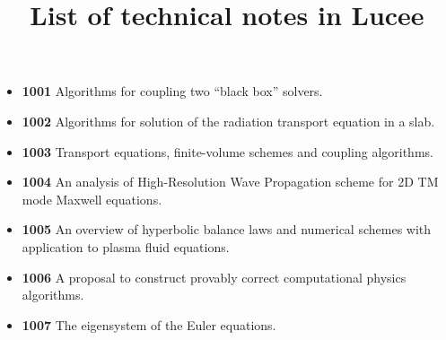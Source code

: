 \documentclass[11pt]{article}
\title{List of technical notes in Lucee}
\author{}
\date{}
\begin{document}
\maketitle

\begin{itemize}
  \item {\bf 1001} Algorithms for coupling two ``black box'' solvers.
  \item {\bf 1002} Algorithms for solution of the radiation transport
    equation in a slab.
  \item {\bf 1003} Transport equations, finite-volume schemes and
    coupling algorithms.
  \item {\bf 1004} An analysis of High-Resolution Wave Propagation
    scheme for 2D TM mode Maxwell equations.
  \item {\bf 1005} An overview of hyperbolic balance laws and
    numerical schemes with application to plasma fluid equations.
  \item {\bf 1006} A proposal to construct provably correct
    computational physics algorithms.
  \item {\bf 1007} The eigensystem of the Euler equations.
\end{itemize}
\end{document}
